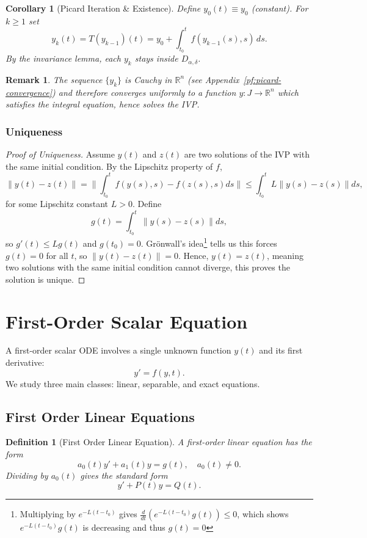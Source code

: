 \documentclass{article}
\newtheorem{corollary}{Corollary}[theorem]
\newtheorem{definition}{Definition}
\newtheorem{remark}{Remark}
\newcommand{\R}{\mathbb{R}}
\begin{document}
\begin{corollary}[Picard Iteration \& Existence]
    Define $y_0(t) \equiv y_0$ (constant). For $k \geq 1$ set
    \[y_k(t) = T(y_{k-1})(t) = y_0 + \int_{t_0}^{t} f(y_{k-1}(s), s)\, ds.\]
    By the invariance lemma, each $y_k$ stays inside $D_{\alpha,\delta}$. 
\end{corollary}
\begin{remark}
    The sequence $\{y_k\}$ is Cauchy in $\R^n$ (see Appendix~\ref{pf:picard-convergence}) and therefore converges uniformly to a function $y: J \to \R^n$ which satisfies the integral equation, hence solves the IVP.
\end{remark}

\subsubsection{Uniqueness}
\begin{proof}[Proof of Uniqueness]
    Assume $y(t)$ and $z(t)$ are two solutions of the IVP with the same initial condition. By the Lipschitz property of $f$,
    \[\|y(t)-z(t)\| = \|\int_{t_0}^t f(y(s),s) - f(z(s),s) ds\| \leq \int_{t_0}^t L\|y(s) - z(s)\|ds,\]
    for some Lipschitz constant $L>0$. Define 
    \[g(t) = \int_{t_0}^{t} \|y(s)-z(s)\|ds,\]
    so $g'(t) \leq L g(t)$ and $g(t_0)=0$. Grönwall's idea\footnote{Multiplying by $e^{-L(t-t_0)}$ gives $\frac{d}{dt}(e^{-L(t-t_0)}g(t)) \le 0$, which shows $e^{-L(t-t_0)}g(t)$ is decreasing and thus $g(t) = 0$} tells us this forces $g(t) = 0$ for all $t$, so $\|y(t) - z(t)\| = 0$. Hence, $y(t) = z(t)$, meaning two solutions with the same initial condition cannot diverge, this proves the solution is unique.
\end{proof}

\section{First-Order Scalar Equation}
A first-order scalar ODE involves a single unknown function $y(t)$ 
and its first derivative:
\[y' = f(y,t).\]
We study three main classes: linear, separable, and exact equations.
\subsection{First Order Linear Equations}
\begin{definition}[First Order Linear Equation]
    A first-order linear equation has the form
    \[a_0(t)y' + a_1(t)y = g(t), \quad a_0(t) \neq 0.\]
    Dividing by $a_0(t)$ gives the standard form
    \[y' + P(t)y = Q(t).\]
\end{definition}
\end{document}
